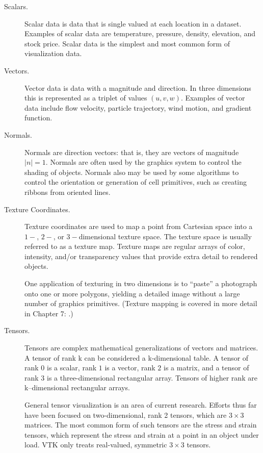 \begin{description}

\item[Scalars.] Scalar data is data that is single valued at each location in a dataset. Examples of scalar data are temperature, pressure, density, elevation, and stock price. Scalar data is the simplest and most common form of visualization data.

\item[Vectors.] Vector data is data with a magnitude and direction. In three dimensions this is represented as a triplet of values $(u, v, w)$. Examples of vector data include flow velocity, particle trajectory, wind motion, and gradient function.

\item[Normals.] Normals are direction vectors: that is, they are vectors of magnitude $|n|=1$. Normals are often used by the graphics system to control the shading of objects. Normals also may be used by some algorithms to control the orientation or generation of cell primitives, such as creating ribbons from oriented lines.

\item[Texture Coordinates.] Texture coordinates are used to map a point from Cartesian space into a $1-$, $2-$, or $3-$dimensional texture space. The texture space is usually referred to as a texture map. Texture maps are regular arrays of color, intensity, and/or transparency values that provide extra detail to rendered objects.

One application of texturing in two dimensions is to ``paste'' a photograph onto one or more polygons, yielding a detailed image without a large number of graphics primitives. (Texture mapping is covered in more detail in Chapter 7:  .)

\item[Tensors.] Tensors are complex mathematical generalizations of vectors and matrices. A tensor of rank k can be considered a k-dimensional table. A tensor of rank $0$ is a scalar, rank $1$ is a vector, rank $2$ is a matrix, and a tensor of rank $3$ is a three-dimensional rectangular array. Tensors of higher rank are k--dimensional rectangular arrays.

General tensor visualization is an area of current research. Efforts thus far have been focused on two-dimensional, rank 2 tensors, which are $3 \times 3$ matrices. The most common form of such tensors are the stress and strain tensors, which represent the stress and strain at a point in an object under load. VTK only treats real-valued, symmetric $3 \times 3$ tensors.

\end{description}

